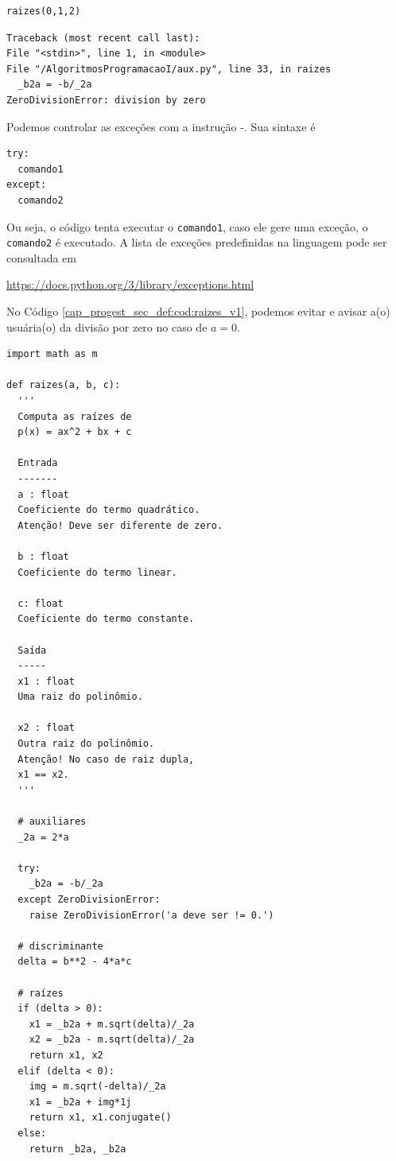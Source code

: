\begin{lstlisting}
raizes(0,1,2)
\end{lstlisting}

\begin{verbatim}
Traceback (most recent call last):
File "<stdin>", line 1, in <module>
File "/AlgoritmosProgramacaoI/aux.py", line 33, in raizes
  _b2a = -b/_2a
ZeroDivisionError: division by zero
\end{verbatim}

Podemos controlar as exceções com a instrução {\PYTHONtry}-{\PYTHONexcept}. Sua sintaxe é

\begin{lstlisting}
try:
  comando1
except:
  comando2
\end{lstlisting}

Ou seja, o código tenta executar o \lstinline+comando1+, caso ele gere uma exceção, o \lstinline+comando2+ é executado. A lista de exceções predefinidas na linguagem pode ser consultada em
\begin{center}
  \url{https://docs.python.org/3/library/exceptions.html}
\end{center}

\begin{ex}
  No Código \ref{cap_progest_sec_def:cod:raizes_v1}, podemos evitar e avisar a(o) usuária(o) da divisão por zero no caso de $a=0$.

\begin{lstlisting}[caption=raizes\_v2.py]
import math as m

def raizes(a, b, c):
  '''
  Computa as raízes de
  p(x) = ax^2 + bx + c

  Entrada
  -------
  a : float
  Coeficiente do termo quadrático.
  Atenção! Deve ser diferente de zero.

  b : float 
  Coeficiente do termo linear.

  c: float
  Coeficiente do termo constante.

  Saída
  -----
  x1 : float
  Uma raiz do polinômio.

  x2 : float
  Outra raiz do polinômio.
  Atenção! No caso de raiz dupla,
  x1 == x2.
  '''

  # auxiliares
  _2a = 2*a

  try:
    _b2a = -b/_2a
  except ZeroDivisionError:
    raise ZeroDivisionError('a deve ser != 0.')

  # discriminante
  delta = b**2 - 4*a*c

  # raízes
  if (delta > 0):
    x1 = _b2a + m.sqrt(delta)/_2a
    x2 = _b2a - m.sqrt(delta)/_2a
    return x1, x2
  elif (delta < 0):
    img = m.sqrt(-delta)/_2a
    x1 = _b2a + img*1j
    return x1, x1.conjugate()
  else:
    return _b2a, _b2a
\end{lstlisting}

\end{ex}

